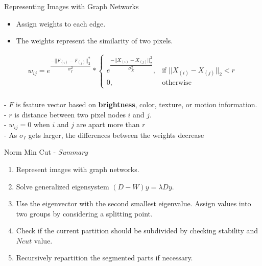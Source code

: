 \documentclass[10pt,xcolor=svgnames]{beamer} %
\begin{document}
\begin{frame}{Representing Images with Graph Networks}
\begin{itemize}
    \item Assign weights to each edge.
    \item The weights represent the similarity of two pixels.
\end{itemize}
\begin{align}
w_{ij} = e^{\dfrac{-||F_{(i)} - F_{(j)}||_2^2}{\sigma_I^2}}
*
    \begin{cases}
    e^\dfrac{-||X_{(i)} - X_{(j)}||_2^2}{\sigma_X^2}, &  \text{if } ||X_{(i)} - X_{(j)}||_2 < r\\
    0,                                               &  \text{otherwise}
    \end{cases}
\end{align}
\\
  \pause
  -   $F$ is feature vector based on \textbf{brightness}, color, texture, or motion information. \\
  \pause
  -   $r$ is distance between two pixel nodes $i$ and $j$. \\ 
  -   $w_{ij} = 0$ when $i$ and $j$ are apart more than $r$ \\
  -   As $\sigma_I$ gets larger, the differences between the weights decrease \\
\end{frame}


\begin{frame}{Norm Min Cut - \textit{Summary}}
    \begin{enumerate}
        \item Represent images with graph networks. 
        \item Solve generalized eigensystem $(D-W)y = \lambda D y $.
        \item Use the eigenvector with the second smallest eigenvalue. Assign values into two groups by considering a splitting point.
        \item Check if the current partition should be subdivided by checking stability and $Ncut$ value.
        \item Recursively repartition the segmented parts if necessary.
    \end{enumerate}
\end{frame}
\end{document}
